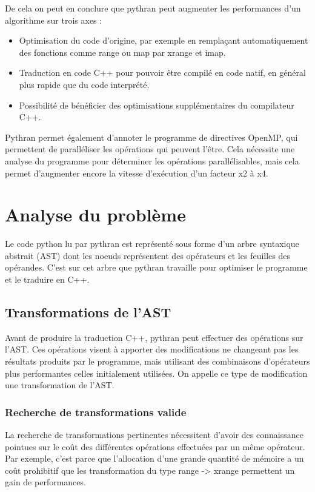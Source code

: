 \documentclass[a4paper]{article}
\begin{document}
De cela on peut en conclure que pythran peut augmenter les
performances d'un algorithme sur trois axes :

\begin{itemize}
\item Optimisation du code d'origine, par exemple en remplaçant
  automatiquement des fonctions comme range ou map par xrange et imap.
\item Traduction en code C++ pour pouvoir être compilé en code natif,
  en général plus rapide que du code interprété.
\item Possibilité de bénéficier des optimisations supplémentaires du
  compilateur C++.
\end{itemize}


Pythran permet également d'annoter le programme de directives OpenMP,
qui permettent de paralléliser les opérations qui peuvent l'être. Cela
nécessite une analyse du programme pour déterminer les opérations
parallélisables, mais cela permet d'augmenter encore la vitesse
d'exécution d'un facteur x2 à x4\cite{PythranRenpar}.

\section{Analyse du problème}

Le code python lu par pythran est représenté sous forme d'un arbre
syntaxique abstrait (AST) dont les noeuds représentent des opérateurs
et les feuilles des opérandes. C'est sur cet arbre que pythran
travaille pour optimiser le programme et le traduire en C++.

\subsection{Transformations de l'AST}

Avant de produire la traduction C++, pythran peut effectuer des
opérations sur l'AST. Ces opérations visent à apporter des
modifications ne changeant pas les résultats produits par le
programme, mais utilisant des combinaisons d'opérateurs plus
performantes celles initialement utilisées. On appelle ce type de
modification une transformation de l'AST.

\subsubsection{Recherche de transformations valide}

La recherche de transformations pertinentes nécessitent d'avoir des
connaissance pointues sur le coût des différentes opérations
effectuées par un même opérateur. Par exemple, c'est parce que
l'allocation d'une grande quantité de mémoire a un coût prohibitif que
les transformation du type range -> xrange permettent un gain de
performances.
\end{document}
